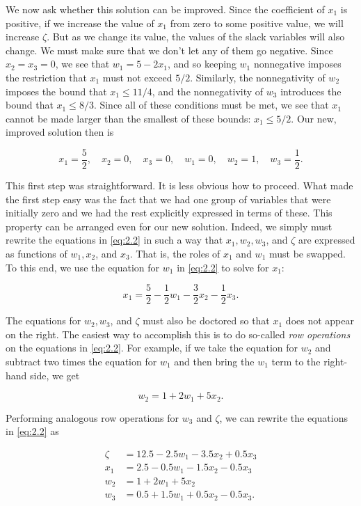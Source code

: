 \documentclass{article}
\begin{document}
    We now ask whether this solution can be improved. Since the coefficient of \( x_{1} \) is positive, if we increase the value of \( x_{1} \) from zero to some positive value, we will increase \( \zeta \). But as we change its value, the values of the slack variables will also change. We must make sure that we don't let any of them go negative. Since \( x_{2}=x_{3}=0 \), we see that \( w_{1}=5-2x_{1} \), and so keeping \( w_{1} \) nonnegative imposes the restriction that \( x_{1} \) must not exceed \( 5/2 \). Similarly, the nonnegativity of \( w_{2} \) imposes the bound that \( x_{1}\leq 11/4 \), and the nonnegativity of \( w_{3} \) introduces the bound that \( x_{1}\leq 8/3 \). Since all of these conditions must be met, we see that \( x_{1} \) cannot be made larger than the smallest of these bounds: \( x_{1}\leq 5/2 \). Our new, improved solution then is
    
    \[ x_{1}=\frac{5}{2},\quad x_{2}=0,\quad x_{3}=0,\quad w_{1}=0,\quad w_{2}=1,\quad w_{3}=\frac{1}{2}. \]
    
    This first step was straightforward. It is less obvious how to proceed. What made the first step easy was the fact that we had one group of variables that were initially zero and we had the rest explicitly expressed in terms of these. This property can be arranged even for our new solution. Indeed, we simply must rewrite the equations in \eqref{eq:2.2} in such a way that \( x_{1},w_{2},w_{3} \), and \( \zeta \) are expressed as functions of \( w_{1},x_{2} \), and \( x_{3} \). That is, the roles of \( x_{1} \) and \( w_{1} \) must be swapped. To this end, we use the equation for \( w_{1} \) in \eqref{eq:2.2} to solve for \( x_{1} \):
    
    \[ x_{1}=\frac{5}{2}-\frac{1}{2}w_{1}-\frac{3}{2}x_{2}-\frac{1}{2}x_{3}. \]
    
    The equations for \( w_{2},w_{3} \), and \( \zeta \) must also be doctored so that \( x_{1} \) does not appear on the right. The easiest way to accomplish this is to do so-called \emph{row operations} on the equations in \eqref{eq:2.2}. For example, if we take the equation for \( w_{2} \) and subtract two times the equation for \( w_{1} \) and then bring the \( w_{1} \) term to the right-hand side, we get
    
    \[ w_{2}=1+2w_{1}+5x_{2}. \]
    
    Performing analogous row operations for \( w_{3} \) and \( \zeta \), we can rewrite the equations in \eqref{eq:2.2} as
    
    \begin{equation}\label{eq:2.3}
    \begin{split}
    \zeta &= 12.5-2.5w_{1}-3.5x_{2}+0.5x_{3} \\
    x_{1} &= 2.5-0.5w_{1}-1.5x_{2}-0.5x_{3} \\
    w_{2} &= 1 + 2w_{1} + 5x_{2} \\
    w_{3} &= 0.5+1.5w_{1}+0.5x_{2}-0.5x_{3}.
    \end{split}
    \end{equation}
    
\end{document}
